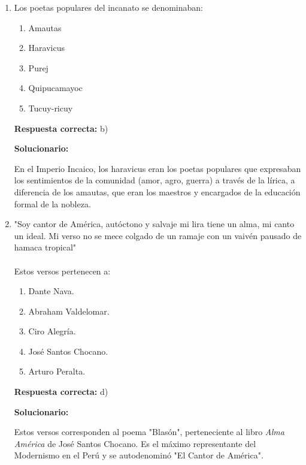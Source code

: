 \begin{enumerate}[resume]

	\item Los poetas populares del incanato se denominaban:
	\begin{enumerate}[label=\alph*)]
		\item Amautas
		\item Haravicus
		\item Purej
		\item Quipucamayoc
		\item Tucuy-ricuy
	\end{enumerate}
	\textbf{Respuesta correcta:} b)

	\vspace{2mm}
	\textbf{Solucionario:}

	En el Imperio Incaico, los haravicus eran los poetas populares que expresaban los sentimientos de la comunidad (amor, agro, guerra) a través de la lírica, a diferencia de los amautas, que eran los maestros y encargados de la educación formal de la nobleza.

	\vspace{6mm}

	\item "Soy cantor de América, autóctono y salvaje mi lira tiene un alma, mi canto un ideal. Mi verso no se mece colgado de un ramaje con un vaivén pausado de hamaca tropical" \\ \\ Estos versos pertenecen a:
	\begin{enumerate}[label=\alph*)]
		\item Dante Nava.
		\item Abraham Valdelomar.
		\item Ciro Alegría.
		\item José Santos Chocano.
		\item Arturo Peralta.
	\end{enumerate}
	\textbf{Respuesta correcta:} d)

	\vspace{2mm}
	\textbf{Solucionario:}

	Estos versos corresponden al poema "Blasón", perteneciente al libro \textit{Alma América} de José Santos Chocano. Es el máximo representante del Modernismo en el Perú y se autodenominó "El Cantor de América".

	\vspace{6mm}

\end{enumerate}



